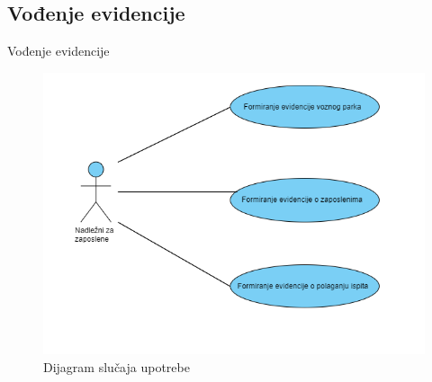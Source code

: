 \documentclass[compress, containsverbatim,mathserif, xcolor=dvipsnames, unicode]{beamer}
\begin{document}

\subsection{Vođenje evidencije}
\begin{frame}{Vođenje evidencije}
        \begin{figure}[h!]
        \begin{center}
          \includegraphics[scale = 0.5]{evidencija.png}
        \end{center}
       \caption{Dijagram slučaja upotrebe}
    \end{figure}   
\end{frame}
\end{document}
